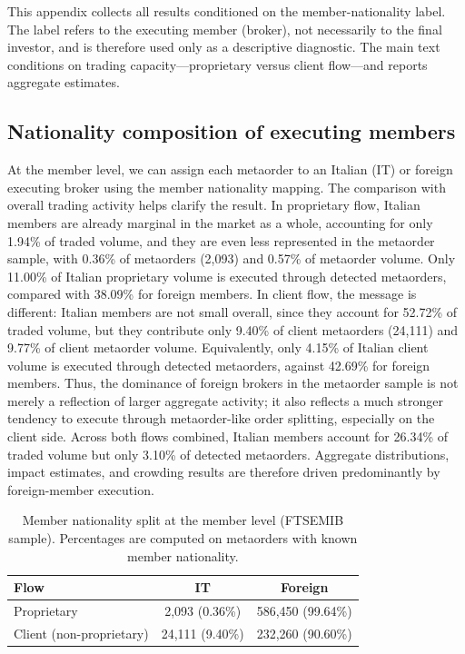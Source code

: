 \documentclass[11pt]{article}
\begin{document}
This appendix collects all results conditioned on the member-nationality label.
The label refers to the executing member (broker), not necessarily to the final
investor, and is therefore used only as a descriptive diagnostic. The main text
conditions on trading capacity---proprietary versus client flow---and reports
aggregate estimates.

\subsection{Nationality composition of executing members}
\label{subsec:metaorder_nationality}

At the member level, we can assign each metaorder to an Italian (IT) or foreign
executing broker using the member nationality mapping. The comparison with overall
trading activity helps clarify the result. In proprietary flow, Italian members are
already marginal in the market as a whole, accounting for only 1.94\% of traded
volume, and they are even less represented in the metaorder sample, with 0.36\% of
metaorders (2,093) and 0.57\% of metaorder volume. Only 11.00\% of Italian proprietary
volume is executed through detected metaorders, compared with 38.09\% for foreign
members. In client flow, the message is different: Italian members are not small
overall, since they account for 52.72\% of traded volume, but they contribute only
9.40\% of client metaorders (24,111) and 9.77\% of client metaorder volume.
Equivalently, only 4.15\% of Italian client volume is executed through detected
metaorders, against 42.69\% for foreign members. Thus, the dominance of foreign
brokers in the metaorder sample is not merely a reflection of larger aggregate
activity; it also reflects a much stronger tendency to execute through metaorder-like
order splitting, especially on the client side. Across both flows combined, Italian
members account for 26.34\% of traded volume but only 3.10\% of detected metaorders.
Aggregate distributions, impact estimates, and crowding results are therefore driven
predominantly by foreign-member execution.

\begin{table}[th!]
  \centering
  \begin{tabular}{lcc}
    \toprule
    Flow & IT & Foreign \\
    \midrule
    Proprietary & 2,093 (0.36\%) & 586,450 (99.64\%) \\
    Client (non-proprietary) & 24,111 (9.40\%) & 232,260 (90.60\%) \\
    \bottomrule
  \end{tabular}
  \caption{Member nationality split at the member level (FTSEMIB sample). Percentages are computed on metaorders with
  known member nationality.}
  \label{tab:metaorder_nationality_share}
\end{table}
\end{document}
